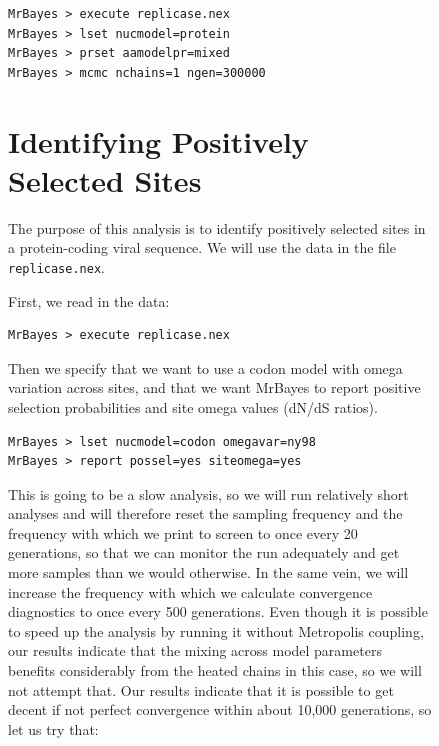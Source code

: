 \documentclass[12pt]{book}
\newcommand{\ttt}[1]{\texttt{#1}}
\begin{document}
\begin{figure}[h]
\begin{singlespacing}
\small
\begin{verbatim}
MrBayes > execute replicase.nex
MrBayes > lset nucmodel=protein
MrBayes > prset aamodelpr=mixed
MrBayes > mcmc nchains=1 ngen=300000
\end{verbatim}
\normalsize
\end{singlespacing}

\section{Identifying Positively Selected Sites}

The purpose of this analysis is to identify positively selected sites in a protein-coding viral
sequence. We will use the data in the file \ttt{replicase.nex}.

First, we read in the data:

\begin{singlespacing}
\small
\begin{verbatim}
MrBayes > execute replicase.nex
\end{verbatim}
\normalsize
\end{singlespacing}

Then we specify that we want to use a codon model with omega variation across sites, and that we
want MrBayes to report positive selection probabilities and site omega values (dN/dS ratios).

\begin{singlespacing}
\small
\begin{verbatim}
MrBayes > lset nucmodel=codon omegavar=ny98
MrBayes > report possel=yes siteomega=yes
\end{verbatim}
\normalsize
\end{singlespacing}

This is going to be a slow analysis, so we will run relatively short analyses and will therefore
reset the sampling frequency and the frequency with which we print to screen to once every 20
generations, so that we can monitor the run adequately and get more samples than we would
otherwise. In the same vein, we will increase the frequency with which we calculate convergence
diagnostics to once every 500 generations. Even though it is possible to speed up the analysis by
running it without Metropolis coupling, our results indicate that the mixing across model
parameters benefits considerably from the heated chains in this case, so we will not attempt that.
Our results indicate that it is possible to get decent if not perfect convergence within about
10,000 generations, so let us try that:


\end{figure}
\end{document}
